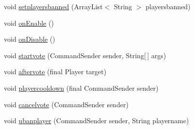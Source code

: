 \begin{DoxyCompactItemize}
\item 
void \hyperlink{classcom_1_1thenewprogramming_1_1_bukkit_1_1_vote4_temp_ban_1_1_vote4_temp_ban_a588ab894e2c08ba09497737e84dce769}{setplayersbanned} (Array\-List$<$ String $>$ playersbanned)
\item 
void \hyperlink{classcom_1_1thenewprogramming_1_1_bukkit_1_1_vote4_temp_ban_1_1_vote4_temp_ban_ab2e9766e2e723e43a5af079e4c4d1ff3}{on\-Enable} ()
\item 
void \hyperlink{classcom_1_1thenewprogramming_1_1_bukkit_1_1_vote4_temp_ban_1_1_vote4_temp_ban_a6abd9dcef83711a6e895d7690a2e29c1}{on\-Disable} ()
\item 
void \hyperlink{classcom_1_1thenewprogramming_1_1_bukkit_1_1_vote4_temp_ban_1_1_vote4_temp_ban_a3a2cc1f41f11a15cff513f423cd911a3}{startvote} (Command\-Sender sender, String\mbox{[}$\,$\mbox{]} args)
\item 
void \hyperlink{classcom_1_1thenewprogramming_1_1_bukkit_1_1_vote4_temp_ban_1_1_vote4_temp_ban_a843a015437de825994c7c8159b11ac93}{aftervote} (final Player target)
\item 
void \hyperlink{classcom_1_1thenewprogramming_1_1_bukkit_1_1_vote4_temp_ban_1_1_vote4_temp_ban_aa942a7aa9abde9c2aea4f652651e4e84}{playercooldown} (final Command\-Sender sender)
\item 
void \hyperlink{classcom_1_1thenewprogramming_1_1_bukkit_1_1_vote4_temp_ban_1_1_vote4_temp_ban_a3265ade936d15c043c3b6a65f56d599b}{cancelvote} (Command\-Sender sender)
\item 
void \hyperlink{classcom_1_1thenewprogramming_1_1_bukkit_1_1_vote4_temp_ban_1_1_vote4_temp_ban_a2f5770755c4e75cd899bce8324236262}{ubanplayer} (Command\-Sender sender, String playername)
\end{DoxyCompactItemize}


